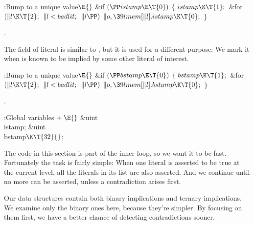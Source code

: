 \Y\B\4:Bump  to a unique value\X${}\E{}$\6
\&{if} ${}(\PP\\{istamp}\E\T{0}){}$\5
${}\{{}$\1\6
${}\\{istamp}\K\T{1};{}$\6
\&{for} ${}(\|l\K\T{2};{}$ ${}\|l<\\{badlit};{}$ ${}\|l\PP){}$\1\5
${}\|o,\39\\{lmem}[\|l].\\{istamp}\K\T{0};{}$\2\6
\4${}\}{}$\2\par
{}.\fi

The  field of literal  is similar to , but it is used
for a different purpose: We mark it when  is known to be implied
by some other literal of interest.

\Y\B\4:Bump  to a unique value\X${}\E{}$\6
\&{if} ${}(\PP\\{bstamp}\E\T{0}){}$\5
${}\{{}$\1\6
${}\\{bstamp}\K\T{1};{}$\6
\&{for} ${}(\|l\K\T{2};{}$ ${}\|l<\\{badlit};{}$ ${}\|l\PP){}$\1\5
${}\|o,\39\\{lmem}[\|l].\\{bstamp}\K\T{0};{}$\2\6
\4${}\}{}$\2\par
{}.\fi

\B{}:Global variables\X${}\mathrel+\E{}$\6
\&{uint} \\{istamp};\6
\&{uint} \\{bstamp}${}\K\T{32}{}$;\par
\fi

The code in this section is part of the inner loop, so we want it to be
fast.
Fortunately the task is fairly simple: When one literal is asserted to be true
at the current  level, all the literals in its  list
are also asserted. And we continue until no more can be asserted,
unless a contradiction arises first.

Our data structures contain both
binary implications and ternary implications. We examine only
the binary ones here, because they're simpler. By focusing on them first, we
have a better chance of detecting contradictions sooner.

